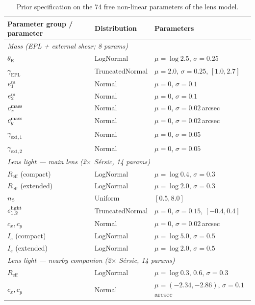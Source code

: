 \documentclass[11pt,letterpaper]{article}
\newcommand{\thetaE}{\ensuremath{\theta_{\mathrm{E}}}}
\newcommand{\gammaEPL}{\ensuremath{\gamma_{\mathrm{EPL}}}}
\newcommand{\gextone}{\ensuremath{\gamma_{\mathrm{ext},1}}}
\newcommand{\gexttwo}{\ensuremath{\gamma_{\mathrm{ext},2}}}
\newcommand{\eone}{\ensuremath{e_{1}}}
\newcommand{\etwo}{\ensuremath{e_{2}}}
\begin{document}
\begin{table}[ht]
\centering
\caption{Prior specification on the 74 free non-linear parameters of the
lens model.}
\label{tab:priors}
\small
\begin{tabular}{lll}
\toprule
Parameter group / parameter & Distribution & Parameters \\
\midrule
\multicolumn{3}{l}{\textit{Mass (EPL + external shear; 8 params)}} \\
\thetaE\           & LogNormal       & $\mu=\log 2.5$, $\sigma=0.25$ \\
\gammaEPL\         & TruncatedNormal & $\mu=2.0$, $\sigma=0.25$, $[1.0,2.7]$ \\
$\eone^{\rm m}$    & Normal          & $\mu=0$, $\sigma=0.1$ \\
$\etwo^{\rm m}$    & Normal          & $\mu=0$, $\sigma=0.1$ \\
$c_{x}^{\rm mass}$ & Normal          & $\mu=0$, $\sigma=0.02$\,arcsec \\
$c_{y}^{\rm mass}$ & Normal          & $\mu=0$, $\sigma=0.02$\,arcsec \\
\gextone\          & Normal          & $\mu=0$, $\sigma=0.05$ \\
\gexttwo\          & Normal          & $\mu=0$, $\sigma=0.05$ \\
\midrule
\multicolumn{3}{l}{\textit{Lens light --- main lens (2$\times$ S\'{e}rsic, 14 params)}} \\
$R_{\mathrm{eff}}$ (compact)  & LogNormal       & $\mu=\log 0.4$, $\sigma=0.3$ \\
$R_{\mathrm{eff}}$ (extended) & LogNormal       & $\mu=\log 2.0$, $\sigma=0.3$ \\
$n_{\rm S}$                   & Uniform         & $[0.5, 8.0]$ \\
$e_{1,2}^{\rm light}$         & TruncatedNormal & $\mu=0$, $\sigma=0.15$, $[-0.4,0.4]$ \\
$c_{x},c_{y}$                 & Normal          & $\mu=0$, $\sigma=0.02$\,arcsec \\
$I_{e}$ (compact)             & LogNormal       & $\mu=\log 5.0$, $\sigma=0.5$ \\
$I_{e}$ (extended)            & LogNormal       & $\mu=\log 2.0$, $\sigma=0.5$ \\
\midrule
\multicolumn{3}{l}{\textit{Lens light --- nearby companion (2$\times$ S\'{e}rsic, 14 params)}} \\
$R_{\mathrm{eff}}$  & LogNormal & $\mu=\log 0.3,\,0.6$, $\sigma=0.3$ \\
$c_{x},c_{y}$       & Normal    & $\mu=(-2.34,-2.86)$, $\sigma=0.1$\,arcsec \\

\end{tabular}
\end{table}
\end{document}
